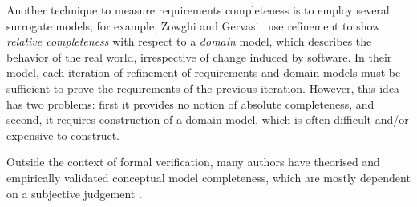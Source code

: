 

Another technique to measure requirements completeness is to employ several surrogate models; for example, Zowghi and Gervasi~\cite{zowghi2003three} use refinement to show {\em relative completeness} with respect to a {\em domain} model, which describes the behavior of the real world, irrespective of change induced by software.  In their model, each iteration of refinement of requirements and domain models must be sufficient to prove the requirements of the previous iteration.  However, this idea has two problems: first it provides no notion of absolute completeness, and second, it requires construction of a domain model, which is often difficult and/or expensive to construct.

Outside the context of formal verification, many authors have theorised and empirically validated conceptual model completeness, which are mostly dependent on a subjective judgement \cite{drechsler2012completeness, firesmith2005your, chang2007finding,katta2013investigating, zowghi2003three, espana2009evaluating}.

%

%


